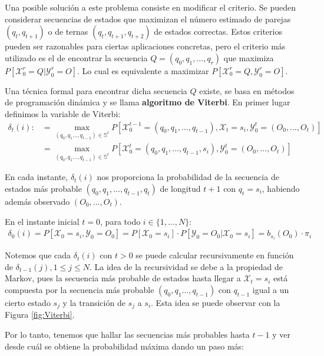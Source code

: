 Una posible solución a este problema consiste en modificar el criterio. Se pueden considerar secuencias de estados que maximizan el número estimado de parejas $(q_t,q_{t+1})$ o de ternas $(q_t,q_{t+1},q_{t+2})$ de estados correctas. Estos criterios pueden ser razonables para ciertas aplicaciones concretas, pero el criterio más utilizado es el de encontrar la secuencia $Q=(q_0, q_1, \dots, q_r)$ que maximiza $P[\mathcal{X}_0^r=Q|\mathcal{Y}_0^r=O]$. Lo cual es equivalente a maximizar $P[\mathcal{X}_0^r=Q,\mathcal{Y}_0^r=O]$.

Una técnica formal para encontrar dicha secuencia $Q$ existe, se basa en métodos de programación dinámica y se llama \textbf{algoritmo de Viterbi}. En primer lugar definimos la variable de Viterbi:
\[
\begin{aligned}
    \delta_t(i):&=\max_{(q_0,q_1\dots,q_{t-1})\in\mathbb{S}^t}P[\mathcal{X}_0^{t-1}=(q_0,q_1,\dots,q_{t-1}),\mathcal{X}_t=s_i,\mathcal{Y}_0^t=(O_0,\dots,O_t)]\\
    &=\max_{(q_0,q_1\dots,q_{t-1})\in\mathbb{S}^t}P[\mathcal{X}_0^{t}=(q_0,q_1,\dots,q_{t-1},s_i),\mathcal{Y}_0^t=(O_0,\dots,O_t)]
\end{aligned}
\]

En cada instante, $\delta_t(i)$ nos proporciona la probabilidad de la secuencia de estados más probable $(q_0,q_1,\dots,q_{t-1},q_t)$ de longitud $t+1$ con $q_t=s_i$, habiendo además observado $(O_0,\dots,O_t)$. 

En el instante inicial $t=0$, para todo $i\in\{1,\dots,N\}$:
\[
\begin{aligned}
    \delta_0(i)=P[\mathcal{X}_0=s_i,\mathcal{Y}_0=O_0]=P[\mathcal{X}_0=s_i]\cdot P[\mathcal{Y}_0=O_0|\mathcal{X}_0=s_i]=b_{s_i}(O_0)\cdot\pi_i
\end{aligned}
\]

Notemos que cada $\delta_t(i)$ con $t>0$ se puede calcular recursivamente en función de $\delta_{t-1}(j),1\leq j\leq N$. La idea de la recursividad se debe a la propiedad de Markov, pues la secuencia más probable de estados hasta llegar a $\mathcal{X}_t=s_i$ está compuesta por la secuencia más probable $(q_0,q_1\dots,q_{t-1})$ con $q_{t-1}$ igual a un cierto estado $s_j$ y la transición de $s_j$ a $s_i$. Esta idea se puede observar con la Figura \ref{fig:Viterbi}. 

Por lo tanto, tenemos que hallar las secuencias más probables hasta $t-1$ y ver desde cuál se obtiene la probabilidad máxima dando un paso más: 


